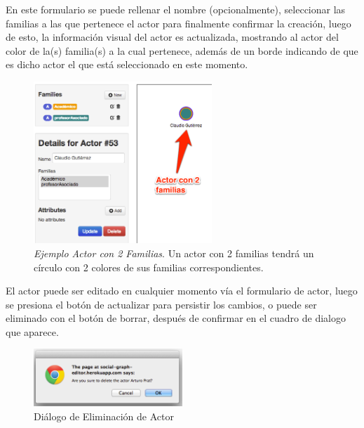 En este formulario se puede rellenar el nombre (opcionalmente), seleccionar las familias a las que pertenece el actor para finalmente confirmar la creación, luego de esto, la información visual del actor es actualizada, mostrando al actor del color de la(s) familia(s) a la cual pertenece, además de un borde indicando de que es dicho actor el que está seleccionado en este momento.\\

\begin{figure}[H]
  \centering
  \includegraphics[width=0.6\textwidth]{images/ejemplo_actor_2_familias.png}
  \caption[Ejemplo Actor con 2 Familias]{\emph{Ejemplo Actor con 2 Familias}. Un actor con 2 familias tendrá un círculo con 2 colores de sus familias correspondientes.}
  \label{ejemplo_actor_2_familias}
\end{figure}

El actor puede ser editado en cualquier momento vía el formulario de actor, luego se presiona el botón de actualizar para persistir los cambios, o puede ser eliminado con el botón de borrar, después de confirmar en el cuadro de dialogo 
que aparece.

\begin{figure}[H]
  \centering
  \includegraphics[width=0.5\textwidth]{images/dialogo_eliminacion_actor.png}
  \caption{Diálogo de Eliminación de Actor}
  \label{dialogo_eliminacion_actor}
\end{figure}


